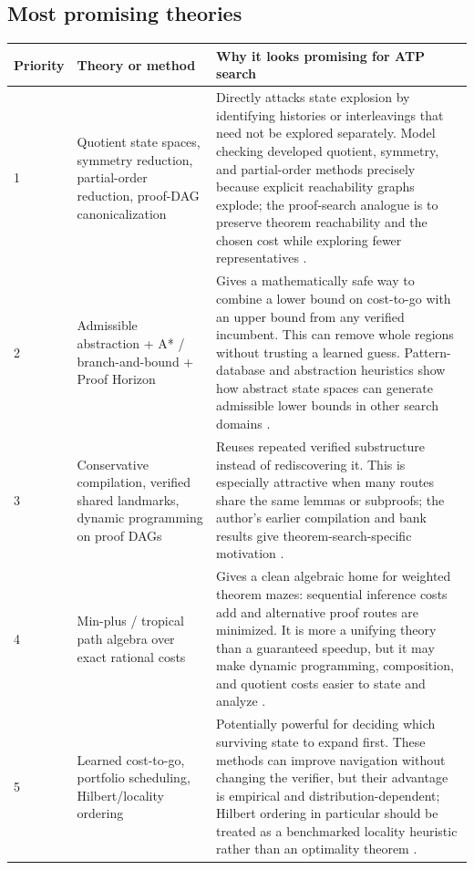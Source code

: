 \subsection{Most promising theories}
\begin{table}[ht]
\centering
\small
\setlength{\tabcolsep}{4pt}
\begin{tabularx}{\textwidth}{p{1.15cm}p{3.4cm}X}
\toprule
Priority & Theory or method & Why it looks promising for ATP search \\
\midrule
1 & Quotient state spaces, symmetry reduction, partial-order reduction, proof-DAG canonicalization & Directly attacks state explosion by identifying histories or interleavings that need not be explored separately. Model checking developed quotient, symmetry, and partial-order methods precisely because explicit reachability graphs explode; the proof-search analogue is to preserve theorem reachability and the chosen cost while exploring fewer representatives \cite{valmari,peled,symmetry,depths}. \\
2 & Admissible abstraction + A* / branch-and-bound + Proof Horizon & Gives a mathematically safe way to combine a lower bound on cost-to-go with an upper bound from any verified incumbent. This can remove whole regions without trusting a learned guess. Pattern-database and abstraction heuristics show how abstract state spaces can generate admissible lower bounds in other search domains \cite{astar,korffelner,horizon,data201}. \\
3 & Conservative compilation, verified shared landmarks, dynamic programming on proof DAGs & Reuses repeated verified substructure instead of rediscovering it. This is especially attractive when many routes share the same lemmas or subproofs; the author's earlier compilation and bank results give theorem-search-specific motivation \cite{depths,data3}. \\
4 & Min-plus / tropical path algebra over exact rational costs & Gives a clean algebraic home for weighted theorem mazes: sequential inference costs add and alternative proof routes are minimized. It is more a unifying theory than a guaranteed speedup, but it may make dynamic programming, composition, and quotient costs easier to state and analyze \cite{gondranminoux}. \\
5 & Learned cost-to-go, portfolio scheduling, Hilbert/locality ordering & Potentially powerful for deciding which surviving state to expand first. These methods can improve navigation without changing the verifier, but their advantage is empirical and distribution-dependent; Hilbert ordering in particular should be treated as a benchmarked locality heuristic rather than an optimality theorem \cite{hilbert,data3}. \\

\end{tabularx}
\end{table}

